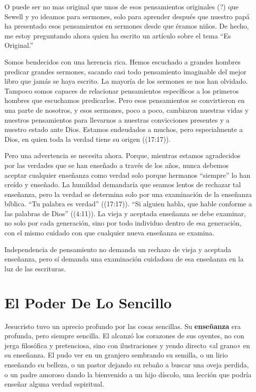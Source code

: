 \documentclass[12pt, twoside, openright]{book}
\begin{document}
O puede ser no mas original que unos de esos pensamientos originales (?) que Sewell y yo ideamos para sermones, solo para aprender después que nuestro papá ha presentado esos pensamientos en sermones desde que éramos niños. De hecho, me estoy preguntando ahora quien ha escrito un artículo sobre el tema “Es Original.”

Somos bendecidos con una herencia rica. Hemos escuchado a grandes hombres predicar grandes sermones, sacando casi todo pensamiento imaginable del mejor libro que jamás se haya escrito. La mayoría de los sermones se nos han olvidado. Tampoco somos capaces de relacionar pensamientos específicos a los primeros hombres que escuchamos predicarlos. Pero esos pensamientos se convirtieron en una parte de nosotros, y esos sermones, poco a poco, cambiaron nuestras vidas y nuestros pensamientos para llevarnos a nuestras convicciones presentes y a nuestro estado ante Dios. Estamos endeudados a muchos, pero especialmente a Dios, en quien toda la verdad tiene su origen ((17:17)). 

Pero una advertencia se necesita ahora. Porque, mientras estamos agradecidos por las verdades que se han enseñado a través de los años, nunca debemos aceptar cualquier enseñanza como verdad solo porque hermanos “siempre” lo han creído y enseñado. La humildad demandaría que seamos lentos de rechazar tal enseñanza, pero la verdad se determina solo por una examinación de la enseñanza bíblica. “Tu palabra es verdad” ((17:17)). “Si alguien habla, que hable conforme a las palabras de Dios” ((4:11)). La vieja y aceptada enseñanza se debe examinar, no solo por cada generación, sino por todo individuo dentro de esa generación, con el mismo cuidado con que cualquier nueva enseñanza se examina. 

Independencia de pensamiento no demanda un rechazo de vieja y aceptada enseñanza, pero sí demanda una examinación cuidadosa de esa enseñanza en la luz de las escrituras. 

\section{El Poder De Lo Sencillo}
Jesucristo tuvo un aprecio profundo por las cosas sencillas. Su \textbf{enseñanza} era profunda, pero siempre sencilla. El alcanzó los corazones de sus oyentes, no con jerga filosófica y pretenciosa, sino con ilustraciones y yendo directo «al grano» en su enseñanza. El pudo ver en un granjero sembrando su semilla, o un lirio enseñando su belleza, o un pastor dejando su rebaño a buscar una oveja perdida, o un padre amoroso dando la bienvenido a un hijo díscolo, una lección que podría enseñar alguna verdad espiritual. 
\end{document}
